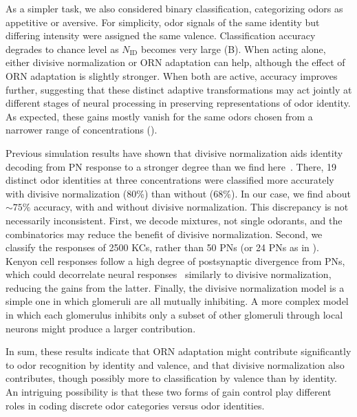 \documentclass[9pt,lineno]{elife}
\begin{document}
{\color{blue} As a simpler task, we also considered binary classification, categorizing odors as appetitive or aversive. }For simplicity, odor signals of the same identity but differing intensity were assigned the same valence. Classification accuracy degrades to chance level as $N_{\text {ID}}$ becomes very large (B). When acting alone, either divisive normalization or ORN adaptation can help, although the effect of ORN adaptation is slightly stronger. When both are active, accuracy improves further, suggesting that these distinct adaptive transformations may act jointly at different stages of neural processing in preserving representations of odor identity. As expected, these gains mostly vanish for the same odors chosen from a narrower range of concentrations (). 

{\color{blue} Previous simulation results have shown that divisive normalization aids identity decoding from PN response to a stronger degree than we find here~\citep{divisive_normalization}. There, 19 distinct odor identities at three concentrations were classified more accurately with divisive normalization (80\%) than without (68\%). In our case, we find about $\sim 75\%$ accuracy, with and without divisive normalization. This discrepancy is not necessarily inconsistent. 
First, we decode mixtures, not single odorants, and the combinatorics may reduce the benefit of divisive normalization. Second, we  classify the responses of 2500 KCs, rather than 50 PNs (or 24 PNs as in \citet{divisive_normalization}). Kenyon cell responses follow a high degree of postsynaptic divergence from PNs, which could decorrelate neural responses~\citep{abbott_axel,litwinkumar,vijay_1} similarly to divisive normalization, reducing the gains from the latter. } Finally, the divisive normalization model is a simple one in which glomeruli are all mutually inhibiting. A more complex model in which each glomerulus inhibits only a subset of other glomeruli through local neurons might produce a larger contribution.

In sum, these results indicate that ORN adaptation might contribute significantly to odor recognition by identity and valence, and that divisive normalization also contributes, though possibly more to classification by valence than by identity. An intriguing possibility is that these two forms of gain control play different roles in coding discrete odor categories versus odor identities.
\end{document}
